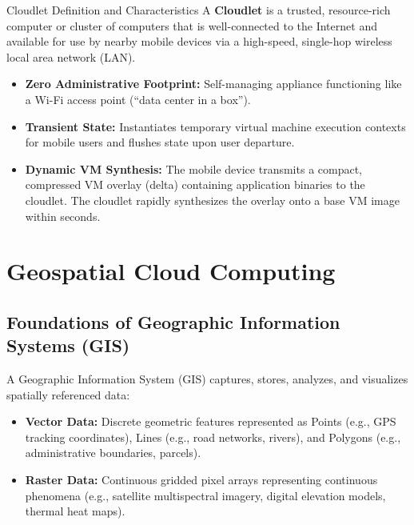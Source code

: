 \documentclass[11pt,a4paper,openany]{report}
\begin{document}
\begin{defbox}{Cloudlet Definition and Characteristics}
A \textbf{Cloudlet} is a trusted, resource-rich computer or cluster of computers that is well-connected to the Internet and available for use by nearby mobile devices via a high-speed, single-hop wireless local area network (LAN).
\begin{itemize}[leftmargin=*]
  \item \textbf{Zero Administrative Footprint:} Self-managing appliance functioning like a Wi-Fi access point (``data center in a box'').
  \item \textbf{Transient State:} Instantiates temporary virtual machine execution contexts for mobile users and flushes state upon user departure.
  \item \textbf{Dynamic VM Synthesis:} The mobile device transmits a compact, compressed VM overlay (delta) containing application binaries to the cloudlet. The cloudlet rapidly synthesizes the overlay onto a base VM image within seconds.
\end{itemize}
\end{defbox}

\section{Geospatial Cloud Computing}
\subsection{Foundations of Geographic Information Systems (GIS)}
A Geographic Information System (GIS) captures, stores, analyzes, and visualizes spatially referenced data:
\begin{itemize}[leftmargin=*]
  \item \textbf{Vector Data:} Discrete geometric features represented as Points (e.g., GPS tracking coordinates), Lines (e.g., road networks, rivers), and Polygons (e.g., administrative boundaries, parcels).
  \item \textbf{Raster Data:} Continuous gridded pixel arrays representing continuous phenomena (e.g., satellite multispectral imagery, digital elevation models, thermal heat maps).
\end{itemize}
\end{document}
